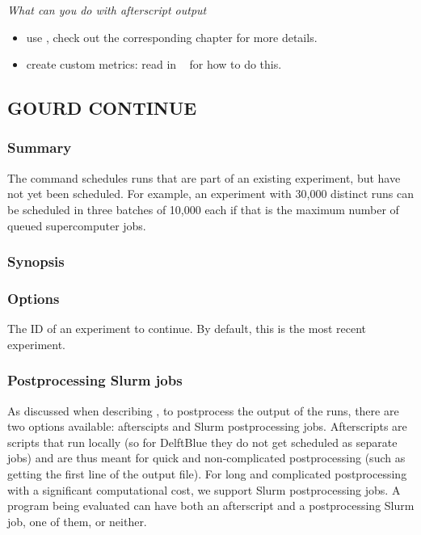 \documentclass[a4paper,english]{article}
\begin{document}
\begin{adjustwidth}{18pt}{0pt}
                \emph{What can you do with afterscript output}

                \begin{itemize}
                    \item use , check out the corresponding chapter for more details.
                    \item create custom metrics: read in ~ for how to do this.
                \end{itemize}
        \subsection{GOURD CONTINUE}

            \subsubsection{Summary}
                The   command schedules runs that are part of an existing
                experiment, but have not yet been scheduled.
                For example, an experiment with 30,000 distinct runs can be scheduled in three batches
                of 10,000 each if that is the maximum number of queued supercomputer jobs.

            \subsubsection{Synopsis}
                 

            \subsubsection{Options}
                \begin{Description}[Options]
                  \item[\Arg{experiment-id}]
                    The ID of an experiment to continue.
                    By default, this is the most recent experiment.
                \end{Description}

            \subsubsection{Postprocessing Slurm jobs}
                As discussed when describing  , to postprocess the output of the runs,
                there are two options available: afterscipts and Slurm postprocessing jobs. Afterscripts are
                scripts that run locally (so for DelftBlue they do not get scheduled as separate jobs) and are
                thus meant for quick and non-complicated postprocessing (such as getting the first line of the
                output file). For long and complicated postprocessing with a significant computational cost,
                we support Slurm postprocessing jobs. A program being evaluated can have both an afterscript
                and a postprocessing Slurm job, one of them, or neither.


\end{adjustwidth}
\end{document}
